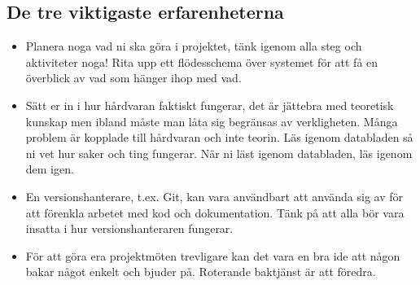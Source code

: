 \documentclass[a4paper,12pt]{article}
\begin{document}
\subsection{De tre viktigaste erfarenheterna}
\begin{itemize}
\item Planera noga vad ni ska göra i projektet, tänk igenom alla steg och
aktiviteter noga! Rita upp ett flödesschema över systemet för att få en
överblick av vad som hänger ihop med vad.
\item Sätt er in i hur hårdvaran faktiskt fungerar, det är jättebra med
teoretisk kunskap men ibland måste man låta sig begränsas av verkligheten.
Många problem är kopplade till hårdvaran och inte teorin. Läs igenom databladen
så ni vet hur saker och ting fungerar. När ni läst igenom databladen, läs igenom
dem igen. 
\item En versionshanterare, t.ex. Git, kan vara användbart att använda sig av för
att förenkla arbetet med kod och dokumentation. Tänk på att alla bör vara
insatta i hur versionshanteraren fungerar. 
\item För att göra era projektmöten trevligare kan det vara en bra ide att någon
bakar något enkelt och bjuder på. Roterande baktjänst är att föredra.
\end{itemize}
\end{document}
